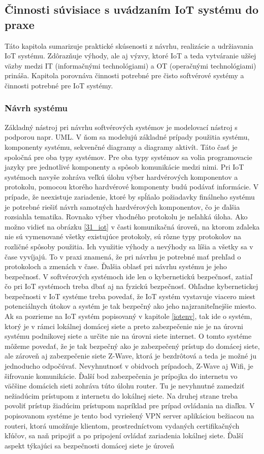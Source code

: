 \subsection{Činnosti súvisiace s uvádzaním IoT systému do praxe}
Táto kapitola sumarizuje praktické skúsenosti z návrhu, realizácie a udržiavania IoT systému. Zdôrazňuje výhody, ale aj výzvy, ktoré  IoT a teda vytváranie užšej väzby medzi IT (informačnými technológiami) a OT (operačnými technológiami) prináša. Kapitola porovnáva činnosti potrebné pre čisto softvérové systémy a činnosti potrebné pre IoT systémy. 
\subsubsection{Návrh systému}
Základný nástroj pri návrhu softvérových systémov je modelovací nástroj s podporou napr. UML. V ňom sa modelujú základné prípady použitia systému, komponenty systému, sekvenčné diagramy a diagramy aktivít. Táto časť je spoločná pre oba typy systémov. Pre oba typy systémov sa volia programovacie jazyky pre jednotlivé komponenty a spôsob komunikácie medzi nimi. Pri IoT systémoch navyše zohráva veľkú úlohu výber hardvérových komponentov a protokolu, pomocou ktorého hardvérové komponenty budú podávať informácie. V prípade, že neexistuje zariadenie, ktoré by spĺňalo požiadavky finálneho systému je potrebné riešiť návrh samotných hardvérových komponentov, čo je ďalšia rozsiahla tematika. Rovnako výber vhodného protokolu je neľahká úloha. Ako možno vidieť na obrázku \ref{31_iot} v časti komunikačná úroveň, na ktorom zďaleka nie sú vymenované všetky existujúce protokoly, sú rôzne typy protokolov na rozličné spôsoby použitia. Ich využitie výhody a nevýhody sa líšia a všetky sa v čase vyvíjajú. To v praxi znamená, že pri návrhu je potrebné mať prehľad o protokoloch a zmenách v čase. Ďalšia oblasť pri návrhu systému je jeho bezpečnosť. V softvérových systémoch ide len o kybernetickú bezpečnosť, zatiaľ čo pri IoT systémoch treba dbať aj na fyzickú bezpečnosť. Ohľadne kybernetickej bezpečnosti v IoT systéme treba povedať, že IoT systém vystavuje viacero miest potenciálnych útokov a systém je tak bezpečný ako jeho najzraniteľnejšie miesto. Ak sa pozrieme na IoT systém popisovaný v kapitole \ref{iotenv}, tak ide o systém, ktorý je v rámci lokálnej domácej siete a preto zabezpečenie nie je na úrovni systému podnikovej siete a určite nie na úrovni siete internet.  O tomto systéme môžeme povedať, že je tak bezpečný ako je zabezpečený prístup do domácej siete, ale zároveň aj zabezpečenie siete Z-Wave, ktorá je bezdrôtová a teda je možné ju jednoducho odpočúvať. Nevyhnutnosť v obidvoch prípadoch, Z-Wave aj Wifi, je šifrovanie komunikácie. Ďalší bod zabezpečenia je prípojka do internetu vo väčšine domácich sieti zohráva túto úlohu router. Tu je nevyhnutné zamedziť nežiadúcim prístupom z internetu do lokálnej siete. Na druhej strane treba povoliť prístup žiadúcim prístupom napríklad pre prípad ovládania na diaľku. V popisovanom systéme je tento bod vyriešený VPN server aplikáciou bežiacou na routeri, ktorá umožňuje klientom, prostredníctvom vydaných certifikačných kľúčov, sa naň pripojiť a po pripojení ovládať zariadenia lokálnej siete. Ďalší aspekt týkajúci sa bezpečnosti domácej siete je úroveň 